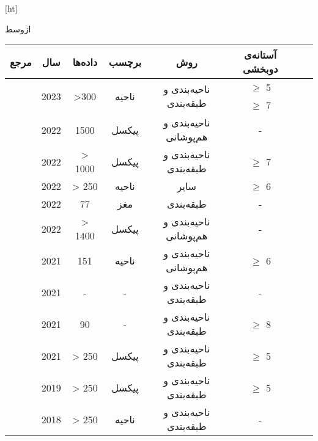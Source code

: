 [ht]

\vspace{1.5em}

‌ازوسط

\begin{tabular}{rccccccc}
    \hline
    مرجع                                    & سال & داده‌ها                & برچسب                    & روش                     & آستانه‌ی دوبخشی\\ \hline
    \multirow{2}{*}{\cite{lee2023clinical}} & \multirow{2}{*}{2023} & \multirow{2}{*}{>300} & \multirow{2}{*}{ناحیه}   & \multirow{2}{*}{ناحیه‌بندی و طبقه‌بندی}   & $\geq$ 5 \\ 
                                            &      &                       &                          &                          & $\geq$ 7 \\ 
    \cite{upadhyay2022deep}                 & 2022 & 1500                  & پیکسل                    & ناحیه‌بندی و هم‌پوشانی   & -         \\
    \cite{cao2022deep}                      & 2022 & > 1000                & پیکسل                    & ناحیه‌بندی و طبقه‌بندی   & $\geq$ 7 \\ 
    \cite{chiang2022deep}                   & 2022 & > 250                 & ناحیه                    & سایر                    & $\geq$ 6 \\ 
    \cite{golkonda2022automated}            & 2022 & 77                    & مغز                      & طبقه‌بندی                & -         \\
    \cite{chen2022improving}                & 2022 & > 1400                & پیکسل                    & ناحیه‌بندی و هم‌پوشانی   & - \\
    \cite{naganuma2021alberta}              & 2021 & 151                   & ناحیه                    & ناحیه‌بندی و هم‌پوشانی   & $\geq$ 6 \\
    \cite{liu2021deep}                      & 2021 & -                     & -                        & ناحیه‌بندی و طبقه‌بندی   & -  \\
    \cite{yu2021automated}                  & 2021 & 90                    & -                        & ناحیه‌بندی و طبقه‌بندی   & $\geq$ 8 \\
    \cite{kuang2021eis}                     & 2021 & > 250                 & پیکسل                    & ناحیه‌بندی و طبقه‌بندی   & $\geq$ 5 \\
    \cite{kuang2019automated}               & 2019 & > 250                 & پیکسل                    & ناحیه‌بندی و طبقه‌بندی   & $\geq$ 5 \\
    \cite{jung2018evaluating}               & 2018 & > 250                 & ناحیه                    & ناحیه‌بندی و طبقه‌بندی   & - \\ \hline
\end{tabular}

